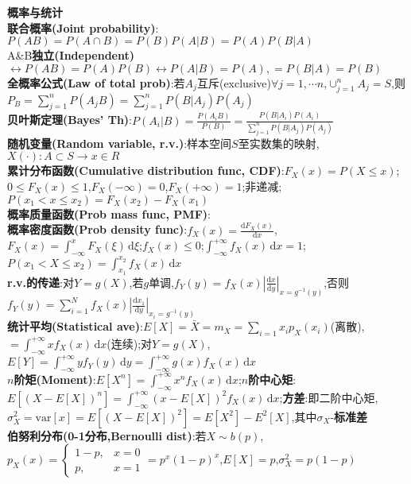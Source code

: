 \documentclass[UTF8,a4paper,10pt]{article}
\providecommand{\abs}[1]{\left\lvert#1\right\rvert}
\begin{document}
\begin{multicols}{2}
    \textbf{概率与统计}\\
    \textbf{联合概率(Joint probability)}:$P(AB)=P(A\cap B)=P(B)P(A\vert B)=P(A)P(B\vert A)$\\
    A\&B\textbf{独立(Independent)}$\leftrightarrow P(AB)=P(A)P(B)\leftrightarrow P(A\vert B)=P(A),=P(B\vert A)=P(B)$\\
    \textbf{全概率公式(Law of total prob)}:若$A_j$互斥(exclusive)$\forall j=1,\cdots n$,$\cup_{j=1}^nA_j=S$,则$P_B=\sum_{j=1}^nP(A_jB)=\sum_{j=1}^nP(B\vert A_j)P(A_j)$\\
    \textbf{贝叶斯定理(Bayes' Th)}:$P(A_i\vert B)=\frac{P(A_iB)}{P(B)}=\frac{P(B\vert A_i)P(A_i)}{\sum_{j=1}^nP(B\vert A_j)P(A_j)}$\\
    \textbf{随机变量(Random variable, r.v.)}:样本空间$S$至实数集的映射,$X(\cdot):A\subset S\rightarrow x\in R$\\
    \textbf{累计分布函数(Cumulative distribution func, CDF)}:$F_X(x)=P(X\leq x)$;$0\leq F_X(x)\leq 1$,$F_X(-\infty)=0$,$F_X(+\infty)=1$;非递减;$P(x_1<x\leq x_2)=F_X(x_2)-F_X(x_1)$\\
    \textbf{概率质量函数(Prob mass func, PMF)}:\\
    \textbf{概率密度函数(Prob density func)}:$f_X(x)=\frac{\mathrm{d}F_X(x)}{\mathrm{d}x}$,$F_X(x)=\int_{-\infty}^xF_X(\xi)\,\mathrm{d}\xi$;$f_X(x)\leq 0$;$\int_{-\infty}^{+\infty}f_X(x)\,\mathrm{d}x=1$;$P(x_1<X\leq x_2)=\int_{x_1}^{x_2}f_X(x)\,\mathrm{d}x$\\
    \textbf{r.v.的传递}:对$Y=g(X)$,若$g$单调,$f_Y(y)=f_X(x)\abs{\frac{\mathrm{d}x}{\mathrm{d}y}}_{x=g^{-1}(y)}$,否则$f_Y(y)=\sum_{i=1}^Nf_X(x)\abs{\frac{\mathrm{d}x_1}{\mathrm{d}y}}_{x_i=g^{-1}(y)}$\\
    \textbf{统计平均(Statistical ave)}:$E[X]=\bar{X}=m_X=\sum_{i=1}x_ip_X(x_i)$(离散),$=\int_{-\infty}^{+\infty}xf_X(x)\,\mathrm{d}x$(连续);对$Y=g(X)$,$E[Y]=\int_{-\infty}^{+\infty}yf_Y(y)\,\mathrm{d}y=\int_{-\infty}^{+\infty}g(x)f_X(x)\,\mathrm{d}x$\\
    \textbf{$n$阶矩(Moment)}:$E[X^n]=\int_{-\infty}^{+\infty}x^nf_X(x)\,\mathrm{d}x$;\textbf{$n$阶中心矩}:$E[(X-E[X])^n]=\int_{-\infty}^{+\infty}(x-E[X])^2f_X(x)\,\mathrm{d}x$;\textbf{方差}:即二阶中心矩,$\sigma_X^2=\mathrm{var}[x]=E[(X-E[X])^2]=E[X^2]-E^2[X]$,其中$\sigma_X$-\textbf{标准差}\\
    \textbf{伯努利分布(0-1分布,Bernoulli dist)}:若$X\sim b(p)$,$p_X(x)=\left\{\begin{array}{ll}
        1-p,&x=0\\
        p,&x=1
    \end{array}\right.=p^x(1-p)^x$,$E[X]=p$,$\sigma_X^2=p(1-p)$\\

\end{multicols}
\end{document}

